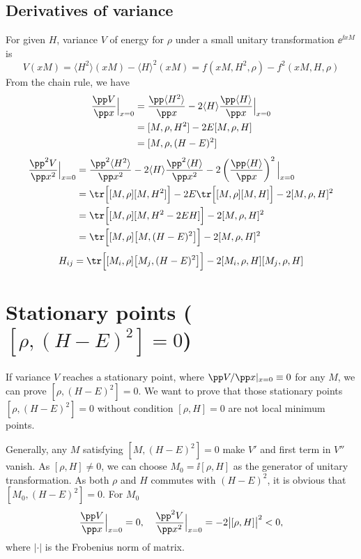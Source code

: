 \documentclass[10pt]{article}
\begin{document}
\subsection{Derivatives of variance}
For given $H$, variance $V$ of energy for $\rho$ under a small unitary transformation $\ee^{\ii xM}$ is 
\begin{equation}
V(xM)=\langle H^2\rangle(xM)-\langle H\rangle^2(xM)=f(xM, H^2, \rho)-f^2(xM, H, \rho)
\end{equation}
From the chain rule, we have
\begin{align}
\frac{\pp V}{\pp x}\Big|_{x=0}&=\frac{\pp \langle H^2\rangle}{\pp x}-2\langle H\rangle\frac{\pp \langle H\rangle}{\pp x}\Big|_{x=0}\\
&=[M, \rho, H^2]-2E[M, \rho, H]\\
&= [M, \rho, (H-E)^2]
\end{align}
\begin{align}
\frac{\pp^2 V}{\pp x^2}\Big|_{x=0}&=\frac{\pp^2 \langle H^2\rangle}{\pp x^2}-2\langle H\rangle\frac{\pp^2 \langle H\rangle}{\pp x^2}-2\left(\frac{\pp \langle H\rangle}{\pp x}\right)^2\Big|_{x=0}\\
&=\tr \Big[[M,\rho][M, H^2]\Big]-2E\tr \Big[[M,\rho][M, H]\Big]-2[M, \rho, H]^2\\
&=\tr \Big[[M,\rho][M, H^2-2EH]\Big]-2[M, \rho, H]^2\\
&=\tr \Big[[M,\rho]\big[M, (H-E)^2\big]\Big]-2[M, \rho, H]^2
\end{align}
\begin{equation}
	H_{ij}=\tr \Big[[M_i,\rho]\big[M_j, (H-E)^2\big]\Big]-2[M_i, \rho, H][M_j, \rho, H]
\end{equation}
\section{Stationary points (\texorpdfstring{$[\rho, (H-E)^2]=0$}{[rho, (H-E)**2]=0})}
If variance $V$ reaches a stationary point, where $\pp V/\pp x|_{x=0}\equiv 0$ for any $M$, we can prove $[\rho, (H-E)^2]=0$. We want to prove that those stationary points $[\rho, (H-E)^2]=0$ without condition $[\rho, H]= 0$ are not local minimum points. 

Generally, any $M$ satisfying $[M, (H-E)^2]=0$ make $V'$ and first term in $V''$ vanish. As $[\rho, H]\neq 0$, we can choose $M_0=\ii[\rho, H]$ as the generator of unitary transformation. As both $\rho$ and $H$ commutes with $(H-E)^2$, it is obvious that $[M_0, (H-E)^2]=0$. For $M_0$
\begin{equation}
\frac{\pp V}{\pp x}\Big|_{x=0}=0,\quad \frac{\pp^2 V}{\pp x^2}\Big|_{x=0}=-2\big|[\rho, H]\big|^2<0,
\end{equation}
where $|\cdot|$ is the Frobenius norm of matrix. 
\end{document}
